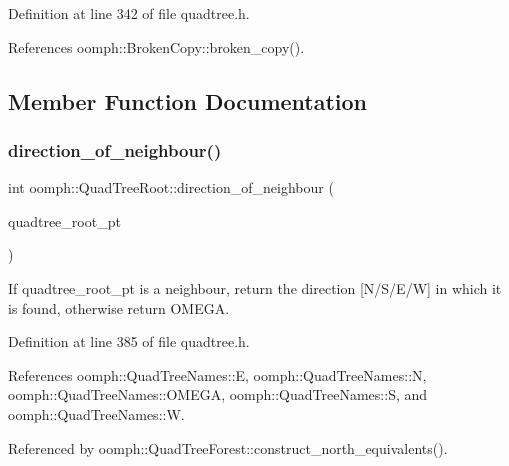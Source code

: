 Definition at line 342 of file quadtree.\+h.



References oomph\+::\+Broken\+Copy\+::broken\+\_\+copy().



\subsection{Member Function Documentation}
\mbox{\label{classoomph_1_1QuadTreeRoot_ac106ae83ae55b7a510d8bad7c5f0db65}} 
\subsubsection{\texorpdfstring{direction\+\_\+of\+\_\+neighbour()}{direction\_of\_neighbour()}}
{\footnotesize\ttfamily int oomph\+::\+Quad\+Tree\+Root\+::direction\+\_\+of\+\_\+neighbour (\begin{DoxyParamCaption}\item[{\hyperlink{classoomph_1_1QuadTreeRoot}{Quad\+Tree\+Root} $\ast$}]{quadtree\+\_\+root\+\_\+pt }\end{DoxyParamCaption})\hspace{0.3cm}{\ttfamily [inline]}}



If quadtree\+\_\+root\+\_\+pt is a neighbour, return the direction \mbox{[}N/\+S/\+E/W\mbox{]} in which it is found, otherwise return O\+M\+E\+GA. 



Definition at line 385 of file quadtree.\+h.



References oomph\+::\+Quad\+Tree\+Names\+::E, oomph\+::\+Quad\+Tree\+Names\+::N, oomph\+::\+Quad\+Tree\+Names\+::\+O\+M\+E\+GA, oomph\+::\+Quad\+Tree\+Names\+::S, and oomph\+::\+Quad\+Tree\+Names\+::W.



Referenced by oomph\+::\+Quad\+Tree\+Forest\+::construct\+\_\+north\+\_\+equivalents().

\mbox{\label{classoomph_1_1QuadTreeRoot_a9b91196bd6112e7f205c0882b163ea2a}} 

